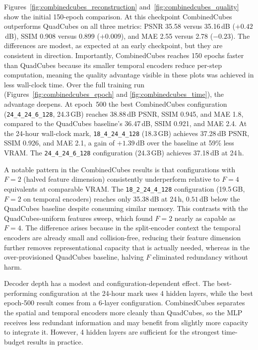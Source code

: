 \documentclass[12pt, a4paper, twoside]{report}
\begin{document}
Figures~\ref{fig:combinedcubes_reconstruction} and~\ref{fig:combinedcubes_quality} show the initial 150-epoch comparison. At this checkpoint CombinedCubes outperforms QuadCubes on all three metrics: PSNR 35.58 versus 35.16\,dB ($+0.42$\,dB), SSIM 0.908 versus 0.899 ($+0.009$), and MAE 2.55 versus 2.78 ($-0.23$). The differences are modest, as expected at an early checkpoint, but they are consistent in direction. Importantly, CombinedCubes reaches 150 epochs faster than QuadCubes because its smaller temporal encoders reduce per-step computation, meaning the quality advantage visible in these plots was achieved in less wall-clock time. Over the full training run (Figures~\ref{fig:combinedcubes_epoch} and \ref{fig:combinedcubes_time}), the advantage deepens. At epoch~500 the best CombinedCubes configuration (\texttt{24\_4\_24\_6\_128}, 24.3\,GB) reaches 38.88\,dB PSNR, SSIM 0.945, and MAE 1.8, compared to the QuadCubes baseline's 36.47\,dB, SSIM 0.921, and MAE 2.4. At the 24-hour wall-clock mark, \texttt{18\_4\_24\_4\_128} (18.3\,GB) achieves 37.28\,dB PSNR, SSIM 0.926, and MAE 2.1, a gain of $+1.39$\,dB over the baseline at 59\% less VRAM. The \texttt{24\_4\_24\_6\_128} configuration (24.3\,GB) achieves 37.18\,dB at 24\,h.

A notable pattern in the CombinedCubes results is that configurations with $F=2$ (halved feature dimension) consistently underperform relative to $F=4$ equivalents at comparable VRAM. The \texttt{18\_2\_24\_4\_128} configuration (19.5\,GB, $F=2$ on temporal encoders) reaches only 35.38\,dB at 24\,h, $0.51$\,dB below the QuadCubes baseline despite consuming similar memory. This contrasts with the QuadCubes-uniform features sweep, which found $F=2$ nearly as capable as $F=4$. The difference arises because in the split-encoder context the temporal encoders are already small and collision-free, reducing their feature dimension further removes representational capacity that is actually needed, whereas in the over-provisioned QuadCubes baseline, halving $F$ eliminated redundancy without harm.

Decoder depth has a modest and configuration-dependent effect. The best-performing configuration at the 24-hour mark uses 4 hidden layers, while the best epoch-500 result comes from a 6-layer configuration. CombinedCubes separates the spatial and temporal encoders more cleanly than QuadCubes, so the MLP receives less redundant information and may benefit from slightly more capacity to integrate it. However, 4 hidden layers are sufficient for the strongest time-budget results in practice.
\end{document}

